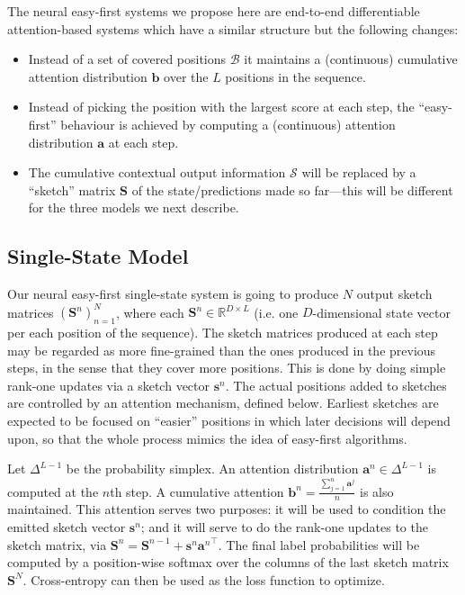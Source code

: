 \documentclass[10pt,a4paper]{article}
\newcommand{\set}[1]{\mathbb{#1}}
\newcommand{\sett}[1]{\mathcal{#1}}
\newcommand{\matr}[1]{\mathbf{#1}}
\newcommand{\vectsymb}[1]{\boldsymbol{#1}}
\newcommand{\sss}{{\vectsymb{s}}}
\newcommand{\aaa}{{\vectsymb{a}}}
\newcommand{\bb}{{\vectsymb{b}}}
\newcommand{\SSS}{{\matr{S}}}
\begin{document}
The neural easy-first systems we propose here are end-to-end differentiable attention-based systems 
which have a similar structure but the following changes:
\begin{itemize}
\item Instead of a set of covered positions $\sett{B}$ it maintains 
a (continuous) cumulative attention distribution $\bb$ over the $L$ positions in the sequence. 
\item Instead of picking the position  with the largest score at each step, 
the ``easy-first'' behaviour is achieved by computing a (continuous) attention distribution $\aaa$ at each step.
\item The cumulative contextual output information $\sett{S}$ will be replaced by a 
``sketch'' matrix $\SSS$ of the state/predictions made so far---this will be different for the three models we next describe.
\end{itemize}



\subsection{Single-State Model}


Our neural easy-first single-state system is going to produce $N$ output sketch matrices
$(\SSS^{n})_{n=1}^{N}$, where each $\SSS^{n} \in \set{R}^{D \times L}$ (i.e. one $D$-dimensional state vector per each position of the sequence). 
The sketch matrices produced at each step may be regarded as more fine-grained 
than the ones produced in the previous steps, in the sense that they cover more positions. This is done by doing simple rank-one updates via a sketch vector $\sss^n$. 
The actual positions added to sketches are controlled by an attention mechanism, defined below. Earliest sketches are expected to be focused on ``easier'' positions in which later decisions will depend upon, so that the whole process mimics the idea of easy-first algorithms. 

Let $\Delta^{L-1}$ be the probability simplex. 
An attention distribution $\aaa^n \in \Delta^{L-1}$ is computed at the $n$th step. 
A cumulative attention $\bb^{n} = \frac{\sum_{j=1}^n \aaa^j}{n}$ is also maintained.
This attention serves two purposes: it will be used to condition the emitted sketch vector $\sss^{n}$; and it will serve to do the rank-one updates to the sketch matrix, via $\SSS^n = \SSS^{n-1} + \sss^n {\aaa^n}^{\top}$. 
The final label probabilities will be computed by a position-wise softmax 
over the columns of the last sketch matrix $\SSS^N$. 
Cross-entropy can then be used as the loss function to optimize. 
\end{document}
